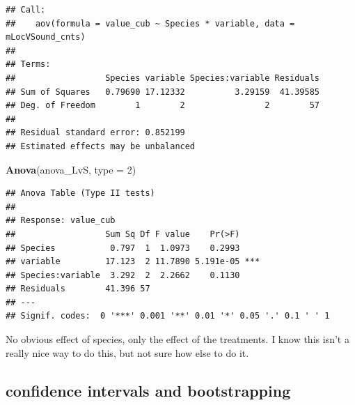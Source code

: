 \documentclass[]{article}
\newenvironment{Shaded}{\begin{snugshade}}{\end{snugshade}}
\newcommand{\KeywordTok}[1]{\textcolor[rgb]{0.13,0.29,0.53}{\textbf{{#1}}}}
\newcommand{\DataTypeTok}[1]{\textcolor[rgb]{0.13,0.29,0.53}{{#1}}}
\newcommand{\DecValTok}[1]{\textcolor[rgb]{0.00,0.00,0.81}{{#1}}}
\newcommand{\NormalTok}[1]{{#1}}
\begin{document}
\begin{verbatim}
## Call:
##    aov(formula = value_cub ~ Species * variable, data = mLocVSound_cnts)
## 
## Terms:
##                  Species variable Species:variable Residuals
## Sum of Squares   0.79690 17.12332          3.29159  41.39585
## Deg. of Freedom        1        2                2        57
## 
## Residual standard error: 0.852199
## Estimated effects may be unbalanced
\end{verbatim}

\begin{Shaded}
\begin{Highlighting}[]
\KeywordTok{Anova}\NormalTok{(anova_LvS, }\DataTypeTok{type =} \DecValTok{2}\NormalTok{)}
\end{Highlighting}
\end{Shaded}

\begin{verbatim}
## Anova Table (Type II tests)
## 
## Response: value_cub
##                  Sum Sq Df F value    Pr(>F)    
## Species           0.797  1  1.0973    0.2993    
## variable         17.123  2 11.7890 5.191e-05 ***
## Species:variable  3.292  2  2.2662    0.1130    
## Residuals        41.396 57                      
## ---
## Signif. codes:  0 '***' 0.001 '**' 0.01 '*' 0.05 '.' 0.1 ' ' 1
\end{verbatim}

No obvious effect of species, only the effect of the treatments. I know
this isn't a really nice way to do this, but not sure how else to do it.

\subsection{confidence intervals and
bootstrapping}\label{confidence-intervals-and-bootstrapping}
\end{document}
